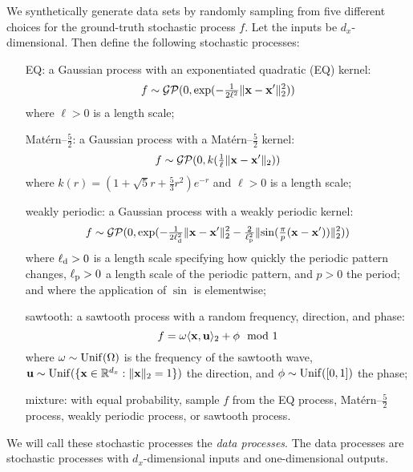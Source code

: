 \documentclass[12pt, twoside]{report}
\begin{document}
We synthetically generate data sets by randomly sampling from five different choices for the ground-truth stochastic process $f$.
Let the inputs be $d_x$-dimensional.
Then define the following stochastic processes:
\begin{itemize}[leftmargin=8em]
    \item[EQ:]
        a Gaussian process with an exponentiated quadratic (EQ) kernel:
        \begin{equation}
           f \sim \mathcal{GP}(0, \exp(-\tfrac1{2\ell^2}\lVert\mathbf{x} - \mathbf{x}'\rVert_2^2)) 
        \end{equation}
        where $\ell > 0$ is a length scale;
    \item[Mat\'ern--$\tfrac52$:]
        a Gaussian process with a Mat\'ern--$\tfrac52$ kernel:
        \begin{equation}
           f \sim \mathcal{GP}(0, k(\tfrac1\ell\lVert\mathbf{x} - \mathbf{x}'\rVert_2))
        \end{equation}
        where $k(r) = (1 + \sqrt{5}r + \tfrac53 r^2)e^{-r}$
        and $\ell > 0$ is a length scale;
    \item[weakly periodic:]
        a Gaussian process with a weakly periodic kernel:
        \begin{equation}
            f \sim \GP(0, \exp(-\tfrac1{2\ell\ss{d}^2}\norm{\vx - \vx'}_2^2 - \tfrac{2}{\ell\ss{p}^2}\norm{\sin(\tfrac{\pi}{p} (\vx - \vx'))}_2^2))  
        \end{equation}
        where $\ell\ss{d} > 0$ is a length scale specifying how quickly the periodic pattern changes, $\ell\ss{p} > 0$ a length scale of the periodic pattern, and $p > 0$ the period;
        and where the application of $\sin$ is elementwise;
    \item[sawtooth:]
        a sawtooth process with a random frequency, direction, and phase:
        \begin{equation}
             f = \omega \langle\mathbf{x}, \mathbf{u}\rangle_2 + \phi \mod 1
        \end{equation}
        where $\omega \sim \operatorname{Unif}(\Omega)$ is the frequency of the sawtooth wave, $\mathbf{u} \sim \operatorname{Unif}(\{\mathbf{x} \in \mathbb{R}^{d_x} : \lVert\mathbf{x}\rVert_2 = 1\})$ the direction, and $\phi \sim \operatorname{Unif}([0, 1])$ the phase;
    \item[mixture:]
        with equal probability, sample $f$ from the EQ process, Mat\'ern--$\tfrac52$ process, weakly periodic process, or sawtooth process.
\end{itemize}
We will call these stochastic processes the \emph{data processes}.
The data processes are stochastic processes with $d_x$-dimensional inputs and one-dimensional outputs.
\end{document}
